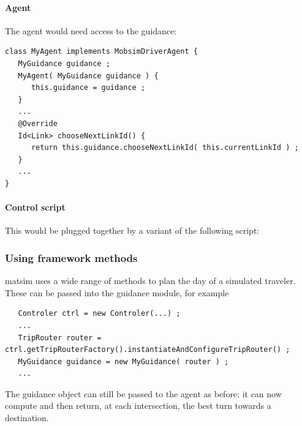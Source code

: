 \paragraph{Agent}

The agent would need access to the guidance:
\begin{lstlisting}
class MyAgent implements MobsimDriverAgent {
   MyGuidance guidance ;
   MyAgent( MyGuidance guidance ) {
      this.guidance = guidance ;
   }  
   ...
   @Override
   Id<Link> chooseNextLinkId() {
      return this.guidance.chooseNextLinkId( this.currentLinkId ) ;
   }
   ...
}
\end{lstlisting}

\paragraph{Control script}

This would be plugged together by a variant of the following script:


\subsubsection{Using framework methods}

\acrshort{matsim} uses a wide range of methods to plan the day of a simulated traveler.  These can be passed into the guidance module, for example
\begin{lstlisting}
   Controler ctrl = new Controler(...) ;
   ...
   TripRouter router = ctrl.getTripRouterFactory().instantiateAndConfigureTripRouter() ;
   MyGuidance guidance = new MyGuidance( router ) ;
   ...
\end{lstlisting}
The guidance object can still be passed to the agent as before; it can now compute and then return, at each intersection, the best turn towards a destination.





